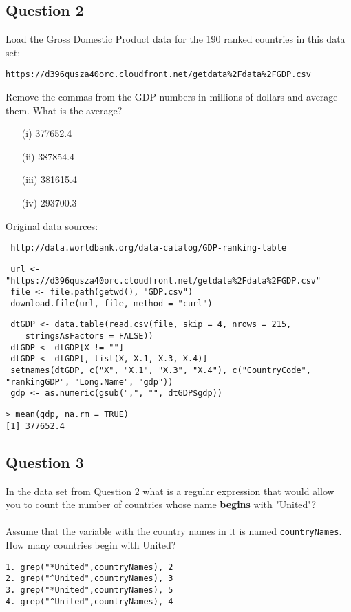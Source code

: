 \documentclass[]{article}
\begin{document}
\subsection*{Question 2}
Load the Gross Domestic Product data for the 190 ranked countries in this data set: 

\begin{verbatim}
https://d396qusza40orc.cloudfront.net/getdata%2Fdata%2FGDP.csv 
\end{verbatim}
Remove the commas from the GDP numbers in millions of dollars and average them. What is the average? 

\begin{itemize}
\item[(i)] 377652.4
\item[(ii)] 387854.4
\item[(iii)] 381615.4
\item[(iv)] 293700.3
\end{itemize}

Original data sources:
\begin{verbatim} http://data.worldbank.org/data-catalog/GDP-ranking-table
\end{verbatim}
\begin{framed}
\begin{verbatim}
 url <- "https://d396qusza40orc.cloudfront.net/getdata%2Fdata%2FGDP.csv"
 file <- file.path(getwd(), "GDP.csv")
 download.file(url, file, method = "curl")
 \end{verbatim}
 \end{framed}
 \begin{framed}
 \begin{verbatim}
 dtGDP <- data.table(read.csv(file, skip = 4, nrows = 215,
    stringsAsFactors = FALSE))
 dtGDP <- dtGDP[X != ""]
 dtGDP <- dtGDP[, list(X, X.1, X.3, X.4)]
 setnames(dtGDP, c("X", "X.1", "X.3", "X.4"), c("CountryCode", "rankingGDP", "Long.Name", "gdp"))
 gdp <- as.numeric(gsub(",", "", dtGDP$gdp))

\end{verbatim}
\end{framed}

\begin{verbatim}
> mean(gdp, na.rm = TRUE)
[1] 377652.4
\end{verbatim}
\newpage
\subsection*{Question 3}
In the data set from Question 2 what is a regular expression that would allow you to count the number of countries whose name \textbf{begins} with "United"? \\ \\ Assume that the variable with the country names in it is named \texttt{countryNames}.\\ How many countries begin with United?
\begin{verbatim}
1. grep("*United",countryNames), 2
2. grep("^United",countryNames), 3
3. grep("*United",countryNames), 5
4. grep("^United",countryNames), 4
\end{verbatim}
\end{document}
